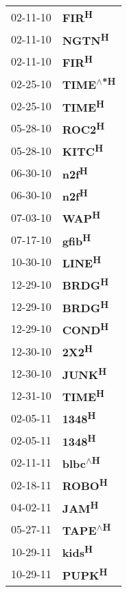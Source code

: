 \begin{supertabular}{p{0.08\textwidth}p{0.2\textwidth}}
 02-11-10 &            \textbf{FIR\textsuperscript{H}} \\
 02-11-10 &           \textbf{NGTN\textsuperscript{H}} \\
 02-11-10 &            \textbf{FIR\textsuperscript{H}} \\
 02-25-10 &  \textbf{TIME\textsuperscript{$\wedge$*H}} \\
 02-25-10 &           \textbf{TIME\textsuperscript{H}} \\
 05-28-10 &           \textbf{ROC2\textsuperscript{H}} \\
 05-28-10 &           \textbf{KITC\textsuperscript{H}} \\
 06-30-10 &            \textbf{n2f\textsuperscript{H}} \\
 06-30-10 &            \textbf{n2f\textsuperscript{H}} \\
 07-03-10 &            \textbf{WAP\textsuperscript{H}} \\
 07-17-10 &           \textbf{gfib\textsuperscript{H}} \\
 10-30-10 &           \textbf{LINE\textsuperscript{H}} \\
 12-29-10 &           \textbf{BRDG\textsuperscript{H}} \\
 12-29-10 &           \textbf{BRDG\textsuperscript{H}} \\
 12-29-10 &           \textbf{COND\textsuperscript{H}} \\
 12-30-10 &            \textbf{2X2\textsuperscript{H}} \\
 12-30-10 &           \textbf{JUNK\textsuperscript{H}} \\
 12-31-10 &           \textbf{TIME\textsuperscript{H}} \\
 02-05-11 &           \textbf{1348\textsuperscript{H}} \\
 02-05-11 &           \textbf{1348\textsuperscript{H}} \\
 02-11-11 &   \textbf{blbc\textsuperscript{$\wedge$H}} \\
 02-18-11 &           \textbf{ROBO\textsuperscript{H}} \\
 04-02-11 &            \textbf{JAM\textsuperscript{H}} \\
 05-27-11 &   \textbf{TAPE\textsuperscript{$\wedge$H}} \\
 10-29-11 &           \textbf{kids\textsuperscript{H}} \\
 10-29-11 &           \textbf{PUPK\textsuperscript{H}} \\

\end{supertabular}
